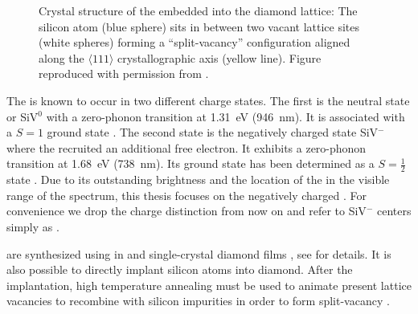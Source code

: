   \begin{figure}[!htb]
		\centering
		\caption[Split-vacancy configuration of \sivs in diamond]{Crystal structure of the \siv embedded into the diamond lattice: The silicon atom (blue sphere) sits in between two vacant lattice sites (white spheres) forming a ``split-vacancy'' configuration aligned along the $\langle 111 \rangle$ crystallographic axis (yellow line). Figure reproduced with permission from \cite{Riedrich-moller2014}.}
		\label{fig::siv_lattice}
	\end{figure}


  The \siv is known to occur in two different charge states. The first is the neutral state or SiV$^0$ with a zero-phonon transition at \SI{1.31}{\eV} (\SI{946}{\nm}). It is associated with a $S = 1$ ground state \cite{DHaenens-Johansson2011}. The second state is the negatively charged state SiV$^{-}$ where the \sivc recruited an additional free electron. It exhibits a zero-phonon transition at \SI{1.68}{\eV} (\SI{738}{\nm}). Its ground state has been determined as a $S = \frac{1}{2}$ state \cite{Goss2007, Hepp2014}. Due to its outstanding brightness and the location of the \zpl in the visible range of the spectrum, this thesis focuses on the negatively charged \siv. For convenience we drop the charge distinction from now on and refer to SiV$^{-}$ centers simply as \sivs.

  \sivs are synthesized using \CVD in \nds and single-crystal diamond films \cite{Neu2011b}, see  for details. It is also possible to directly implant silicon atoms into diamond. After the implantation, high temperature annealing must be used to animate present lattice vacancies to recombine with silicon impurities in order to form split-vacancy \sivs \cite{Collins1983,Hepp2014}.

